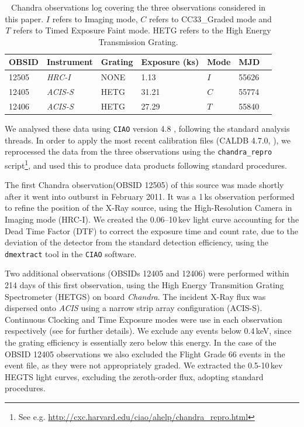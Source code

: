 \begin{table}
\centering
\begin{tabular}{lllllll}
\hline
\hline
\scriptsize OBSID &\scriptsize  Instrument &\scriptsize Grating &\scriptsize Exposure (ks) &\scriptsize  Mode &\scriptsize MJD\\
\hline
12505  	& \textit{HRC-I}    &   NONE      &    1.13      & $I$ & 55626\\
12405  	& \textit{ACIS-S} &   HETG     &    31.21     & $C$ & 55774\\
12406  	& \textit{ACIS-S} &   HETG     &    27.29     & $T$ & 55840\\
\hline
\hline
\end{tabular}
\caption{Chandra observations log covering the three observations considered in this paper.  $I$ refers to Imaging mode, $C$ refers to CC33\_Graded mode and $T$ refers to Timed Exposure Faint mode.  HETG refers to the High Energy Transmission Grating.}
\label{tab:Chandra}
\end{table}

\par We analysed these data using \texttt{CIAO} version 4.8 \citep{Fruscione_Ciao}, following the standard analysis threads. In order to apply the most recent calibration files (CALDB 4.7.0, \citealp{Graessle_ChaCALDB}), we reprocessed the data from the three observations using the \texttt{chandra\_repro} script\footnote{See e.g. \url{http://cxc.harvard.edu/ciao/ahelp/chandra_repro.html}}, and used this to produce data products following standard procedures.
\par The first Chandra observation(OBSID 12505) of this source was made shortly after it went into outburst in February 2011. It was a 1\,ks observation performed to refine the position of the X-Ray source, using the High-Resolution Camera in Imaging mode (HRC-I). We created the 0.06--10\,kev light curve accounting for the Dead Time Factor (DTF) to correct the exposure time and count rate, due to the deviation of the detector from the standard detection efficiency,  using the \texttt{dmextract} tool in the \texttt{CIAO} software.
\par Two additional observations (OBSIDs 12405 and 12406) were performed within 214 days of this first observation, using the High Energy Transmition Grating Spectrometer (HETGS) on board \textit{Chandra}. The incident X-Ray flux was dispersed onto \textit{ACIS} using a narrow strip array configuration (ACIS-S). Continuous Clocking and Time Exposure modes were use in each observation respectively (see \citealp{King_IGRWinds} for further details). We exclude any events below 0.4\,keV, since the grating efficiency is essentially zero below this energy. In the case of the OBSID 12405 observations we also excluded the Flight Grade 66 events in the event file, as they were not appropriately graded. We extracted the 0.5-10\,kev HEGTS light curves, excluding the zeroth-order flux, adopting standard procedures.

